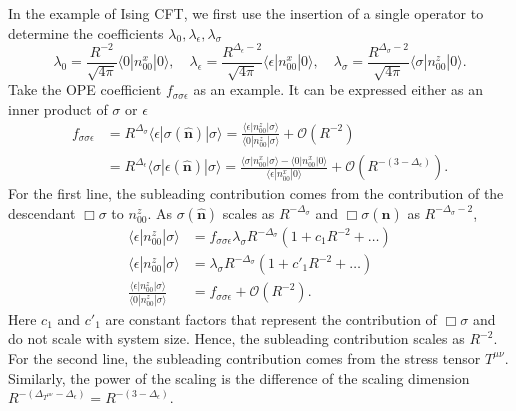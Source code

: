\documentclass{timesjhep}
\begin{document}
In the example of Ising CFT, we first use the insertion of a single operator to determine the coefficients $\lambda_0,\lambda_\epsilon,\lambda_\sigma$
\begin{equation}
    \lambda_0=\frac{R^{-2}}{\sqrt{4\pi}}\langle 0|n^x_{00}|0\rangle,\quad\lambda_\epsilon=\frac{R^{\Delta_\epsilon-2}}{\sqrt{4\pi}}\langle \epsilon|n^x_{00}|0\rangle,\quad\lambda_\sigma=\frac{R^{\Delta_\sigma-2}}{\sqrt{4\pi}}\langle \sigma|n^z_{00}|0\rangle.
\end{equation}
Take the OPE coefficient $f_{\sigma\sigma\epsilon}$ as an example. It can be expressed either as an inner product of $\sigma$ or $\epsilon$
\begin{align}
    f_{\sigma\sigma\epsilon}&=R^{\Delta_\sigma}\langle\epsilon|\sigma(\hat{\mathbf{n}})|\sigma\rangle=\frac{\langle\epsilon|n_{00}^z|\sigma\rangle}{\langle 0|n_{00}^z|\sigma\rangle}+\mathcal{O}(R^{-2})\nonumber\\
    &=R^{\Delta_\epsilon}\langle\sigma|\epsilon(\hat{\mathbf{n}})|\sigma\rangle=\frac{\langle\sigma|n^x_{00}|\sigma\rangle-\langle0|n^x_{00}|0\rangle}{\langle\epsilon|n^x_{00}|0\rangle}+\mathcal{O}(R^{-(3-\Delta_\epsilon)}).
\end{align}
For the first line, the subleading contribution comes from the contribution of the descendant $\Box\sigma$ to $n_{00}^z$. As $\sigma(\hat{\mathbf{n}})$ scales as $R^{-\Delta_\sigma}$ and $\Box\sigma(\hat{\mathbf{n}})$ as $R^{-\Delta_\sigma-2}$,
\begin{align}
    \langle\epsilon|n_{00}^z|\sigma\rangle&=f_{\sigma\sigma\epsilon}\lambda_\sigma R^{-\Delta_\sigma}(1+c_1R^{-2}+\dots)\nonumber\\
    \langle\epsilon|n_{00}^z|\sigma\rangle&=\lambda_\sigma R^{-\Delta_\sigma}(1+c'_1R^{-2}+\dots)\nonumber\\
    \frac{\langle\epsilon|n_{00}^z|\sigma\rangle}{\langle 0|n_{00}^z|\sigma\rangle}&=f_{\sigma\sigma\epsilon}+\mathcal{O}(R^{-2}).
\end{align}
Here $c_1$ and $c'_1$ are constant factors that represent the contribution of $\Box\sigma$ and do not scale with system size. Hence, the subleading contribution scales as $R^{-2}$. For the second line, the subleading contribution comes from the stress tensor $T^{\mu\nu}$. Similarly, the power of the scaling is the difference of the scaling dimension $R^{-(\Delta_{T^{\mu\nu}}-\Delta_\epsilon)}=R^{-(3-\Delta_\epsilon)}$.
\end{document}
